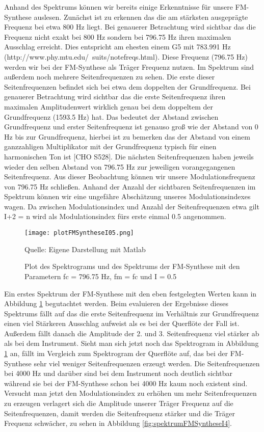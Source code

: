 Anhand des Spektrums können wir bereits einige Erkenntnisse für unsere FM-Synthese auslesen. Zunächst ist zu erkennen das die am stärksten ausgeprägte Frequenz bei etwa 800 Hz liegt. Bei genauerer Betrachtung wird sichtbar das die Frequenz nicht exakt bei 800 Hz sondern bei 796.75 Hz ihren maximalen Ausschlag erreicht. Dies entspricht am ehesten einem G5 mit 783.991 Hz (http://www.phy.mtu.edu/~suits/notefreqs.html). Diese Frequenz (796.75 Hz) werden wir bei der FM-Synthese als Träger Frequenz nutzen. Im Spektrum sind außerdem noch mehrere Seitenfrequenzen zu sehen. Die erste dieser Seitenfrequenzen befindet sich bei etwa dem doppelten der Grundfrequenz. Bei genauerer Betrachtung wird sichtbar das die erste Seitenfrequenz ihren maximalen Amplitudenwert wirklich genau bei dem doppeltem der Grundfrequenz (1593.5 Hz) hat. Das bedeutet der Abstand zwischen Grundfrequenz und erster Seitenfrequenz ist genauso groß wie der Abstand von 0 Hz bis zur Grundfrequenz, hierbei ist zu bemerken das der Abstand von einem ganzzahligen Multiplikator mit der Grundfrequenz typisch für einen harmonischen Ton ist [CHO S528]. Die nächsten Seitenfrequenzen haben jeweils wieder den selben Abstand von 796.75 Hz zur jeweiligen vorangegangenen Seitenfrequenz. Aus dieser Beobachtung können wir unsere Modulationsfrequenz von 796.75 Hz schließen. Anhand der Anzahl der sichtbaren Seitenfrequenzen im Spektrum können wir eine ungefähre Abschätzung unseres Modulationsindexes wagen. Da zwischen Modulationsindex und Anzahl der Seitenfrequenzen etwa gilt I+2 = n wird als Modulationsindex fürs erste einmal 0.5 angenommen. 

\begin{figure} [ht]
\centering
  \texttt{[image: plotFMSyntheseI05.png]}
\caption{Plot des Spektrograms und des Spektrums der FM-Synthese mit den Parametern fc = 796.75 Hz, fm = fc und I = 0.5 }
\label{fig:plotFMSyntheseI05}
Quelle: Eigene Darstellung mit Matlab
\end{figure}

Ein erstes Spektrum der FM-Synthese mit den eben festgelegten Werten kann in Abbildung \ref{fig:plotFMSyntheseI05} begutachtet werden. Beim evaluieren der Ergebnisse dieses Spektrums fällt auf das die erste Seitenfrequenz im Verhältnis zur Grundfrequenz einen viel Stärkeren Ausschlag aufweist als es bei der Querflöte der Fall ist. Außerdem fällt danach die Amplitude der 2. und 3. Seitenfrequenz viel stärker ab als bei dem Instrument. Sieht man sich jetzt noch das Spektrogram in Abbildung \ref{fig:plotFMSyntheseI05} an, fällt im Vergleich zum Spektrogram der Querflöte auf, das bei der FM-Synthese sehr viel weniger Seitenfrequenzen erzeugt werden. Die Seitenfrequenzen bei 4000 Hz und darüber sind bei dem Instrument noch deutlich sichtbar während sie bei der FM-Synthese schon bei 4000 Hz kaum noch existent sind. Versucht man jetzt den Modulationsindex zu erhöhen um mehr Seitenfrequenzen zu erzeugen verlagert sich die Amplitude unserer Träger Frequenz auf die Seitenfrequenzen, damit werden die Seitenfrequenz stärker und die Träger Frequenz schwächer, zu sehen in Abbildung \ref{fig:spektrumFMSyntheseI4}.

